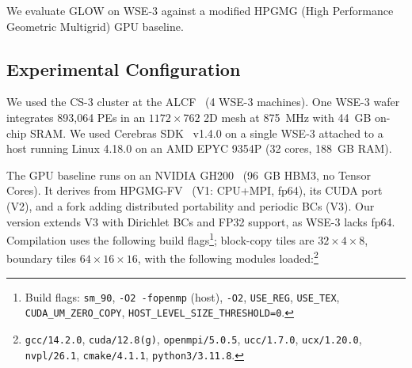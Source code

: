 \documentclass[conference]{IEEEtran}
\begin{document}
        We evaluate GLOW on WSE-3 against a modified HPGMG (High Performance Geometric Multigrid) GPU baseline.
        \subsection{Experimental Configuration}
            We used the CS-3 cluster at the ALCF~\cite{alcf_aitestbed} (4 WSE-3 machines). One WSE-3 wafer integrates 893,064 PEs in an $1172 \times 762$ 2D mesh at 875~MHz with 44~GB on-chip SRAM. We used Cerebras SDK~\cite{cerebras_sdk} v1.4.0 on a single WSE-3 attached to a host running Linux 4.18.0 on an AMD EPYC 9354P (32 cores, 188~GB RAM).

            \begin{sloppypar}
            The GPU baseline runs on an NVIDIA GH200~\cite{tacc_vista} (96~GB HBM3, no Tensor Cores). It derives from HPGMG-FV~\cite{hpgmg_org} (V1: CPU+MPI, fp64), its CUDA port~\cite{hpgmg_cuda} (V2), and a fork adding distributed portability and periodic BCs (V3). Our version extends V3 with Dirichlet BCs and FP32 support, as WSE-3 lacks fp64. Compilation uses the following build flags\footnote{Build flags: \texttt{sm\_90}, \texttt{-O2 -fopenmp} (host), \texttt{-O2}, \texttt{USE\_REG}, \texttt{USE\_TEX}, \texttt{CUDA\_UM\_ZERO\_COPY}, \texttt{HOST\_LEVEL\_SIZE\_THRESHOLD=0}.}; block-copy tiles are $32{\times}4{\times}8$, boundary tiles $64{\times}16{\times}16$, with the following modules loaded:\footnote{\texttt{gcc/14.2.0}, \texttt{cuda/12.8(g)}, \texttt{openmpi/5.0.5}, \texttt{ucc/1.7.0}, \texttt{ucx/1.20.0}, \texttt{nvpl/26.1}, \texttt{cmake/4.1.1}, \texttt{python3/3.11.8}.}
            \end{sloppypar}
       
\end{document}
